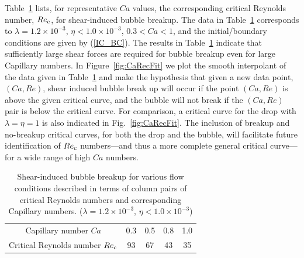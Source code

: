 \documentclass[review]{elsarticle}
\begin{document}
Table~\ref{tab:CaRecComparison} lists, for representative $Ca$ values, the
corresponding critical Reynolds number, $Re_{\rm c}$, for shear-induced bubble
breakup.  The data in Table~\ref{tab:CaRecComparison} corresponds to $\lambda =
1.2 \times 10^{-3}$, $\eta < 1.0 \times 10^{-3}$, $0.3<Ca<1$, and the
initial/boundary conditions are given by (\ref{IC_BC}).  The results in
Table~\ref{tab:CaRecComparison} indicate that sufficiently large shear forces
are required for bubble breakup even for large Capillary numbers.  In
Figure~\ref{fig:CaRecFit} we plot the smooth interpolant of the data given in
Table~\ref{tab:CaRecComparison} and make the hypothesis that given a new data
point, $(Ca,Re)$,  shear induced bubble break up will occur if the point
$(Ca,Re)$ is above the given critical curve, and the bubble will not break if
the $(Ca,Re)$ pair is below the critical curve.  For comparison,
a critical curve for the drop with $\lambda =\eta = 1$ is also indicated in
Fig.~\ref{fig:CaRecFit}.  The inclusion of breakup and no-breakup critical
curves, for both the drop and the bubble, will facilitate future identification
of $Re_{\rm c}$ numbers---and thus a more complete general critical curve---for
a wide range of high $Ca$ numbers.

\begin{table}[tbh]
\caption{Shear-induced bubble breakup for various flow 
	conditions described in terms
        of column pairs of critical Reynolds numbers and 
	corresponding Capillary numbers.
        ($\lambda = 1.2 \times 10^{-3}$, $\eta < 1.0 \times 10^{-3}$) 
	}
\label{tab:CaRecComparison}
\footnotesize
\center
\begin{tabular}{ c  c  c  c  c }
\hline
\hline
Capillary number $Ca$            & 0.3  & 0.5  & 0.8  & 1.0  \\
Critical Reynolds number $Re_{\rm c}$  & 93   & 67   & 43   & 35   \\
\hline
\hline
\end{tabular}
\end{table}
\end{document}
